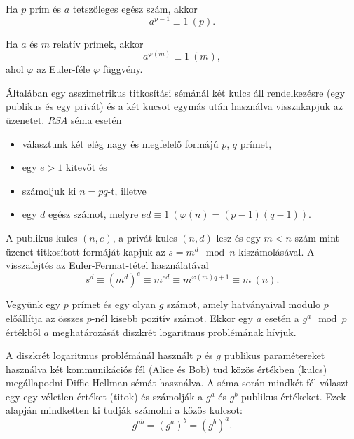 
\begin{theorem}
  Ha $p$ prím és $a$ tetszőleges egész szám, akkor\[ a^{p-1}\equiv 1\ (p).\]
\end{theorem}

\begin{theorem}
  Ha $a$ és $m$ relatív prímek, akkor \[ a^{\varphi(m)}\equiv 1\ (m), \] ahol $\varphi$ az
  Euler-féle $\varphi$ függvény.
\end{theorem}

\begin{definition}
  Általában egy asszimetrikus titkosítási sémánál két kulcs áll rendelkezésre (egy publikus és egy
  privát) és a két kucsot egymás után használva visszakapjuk az üzenetet. \emph{RSA} séma esetén
  \begin{itemize}
    \item választunk két elég nagy és megfelelő formájú $p$, $q$ prímet,
    \item egy $e>1$ kitevőt és
    \item számoljuk ki $n=pq$-t, illetve
    \item egy $d$ egész számot, melyre $ed\equiv 1\ (\varphi(n)=(p-1)(q-1))$.
  \end{itemize}
  A publikus kulcs $(n,e)$, a privát kulcs $(n,d)$ lesz és egy $m<n$ szám mint üzenet titkosított
  formáját kapjuk az $s = m^d \mod n$ kiszámolásával. A visszafejtés az Euler-Fermat-tétel
  használatával \[ s^d\equiv (m^d)^e\equiv m^{ed}\equiv m^{\varphi(m)q+1}\equiv m\ (n). \]
\end{definition}

\begin{definition}
  Vegyünk egy $p$ prímet és egy olyan $g$ számot, amely hatványaival modulo $p$ előállítja az
  összes $p$-nél kisebb pozitív számot. Ekkor egy $a$ esetén a $g^a\mod p$ értékből $a$
  meghatározását diszkrét logaritmus problémának hívjuk.
\end{definition}

\begin{definition}
  A diszkrét logaritmus problémánál használt $p$ és $g$ publikus paramétereket használva két
  kommunikációs fél (Alice és Bob) tud közös értékben (kulcs) megállapodni Diffie-Hellman
  sémát használva. A séma során mindkét fél választ egy-egy véletlen értéket (titok) és számolják a
  $g^a$ és $g^b$ publikus értékeket. Ezek alapján mindketten ki tudják számolni a közös kulcsot:
  \[g^{ab} = (g^a)^b = (g^b)^a.\]
\end{definition}
